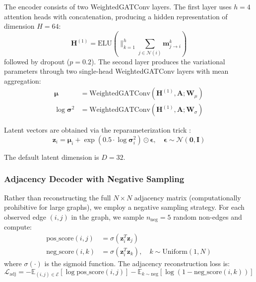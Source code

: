 \documentclass{article}
\begin{document}
The encoder consists of two WeightedGATConv layers. The first layer uses $h = 4$ attention heads with concatenation, producing a hidden representation of dimension $H = 64$:
\begin{equation}
\mathbf{H}^{(1)} = \text{ELU}\left(\|_{k=1}^{h} \sum_{j \in \mathcal{N}(i)} \mathbf{m}_{j \to i}^k \right)
\end{equation}
followed by dropout ($p = 0.2$). The second layer produces the variational parameters through two single-head WeightedGATConv layers with mean aggregation:
\begin{align}
\boldsymbol{\mu} &= \text{WeightedGATConv}(\mathbf{H}^{(1)}, \mathbf{A}; \mathbf{W}_{\mu}) \\
\log \boldsymbol{\sigma}^2 &= \text{WeightedGATConv}(\mathbf{H}^{(1)}, \mathbf{A}; \mathbf{W}_{\sigma})
\end{align}

Latent vectors are obtained via the reparameterization trick \citep{kingma2013auto}:
\begin{equation}
\mathbf{z}_i = \boldsymbol{\mu}_i + \exp(0.5 \cdot \log\boldsymbol{\sigma}_i^2) \odot \boldsymbol{\epsilon}, \quad \boldsymbol{\epsilon} \sim \mathcal{N}(\mathbf{0}, \mathbf{I})
\end{equation}

The default latent dimension is $D = 32$.

\subsubsection{Adjacency Decoder with Negative Sampling}

Rather than reconstructing the full $N \times N$ adjacency matrix (computationally prohibitive for large graphs), we employ a negative sampling strategy. For each observed edge $(i, j)$ in the graph, we sample $n_{\text{neg}} = 5$ random non-edges and compute:
\begin{align}
\text{pos\_score}(i,j) &= \sigma(\mathbf{z}_i^T \mathbf{z}_j) \\
\text{neg\_score}(i,k) &= \sigma(\mathbf{z}_i^T \mathbf{z}_k), \quad k \sim \text{Uniform}(1, N)
\end{align}
where $\sigma(\cdot)$ is the sigmoid function. The adjacency reconstruction loss is:
\begin{equation}
\mathcal{L}_{\text{adj}} = -\mathbb{E}_{(i,j) \in \mathcal{E}}[\log \text{pos\_score}(i,j)] - \mathbb{E}_{k \sim \text{neg}}[\log(1 - \text{neg\_score}(i,k))]
\end{equation}
\end{document}
